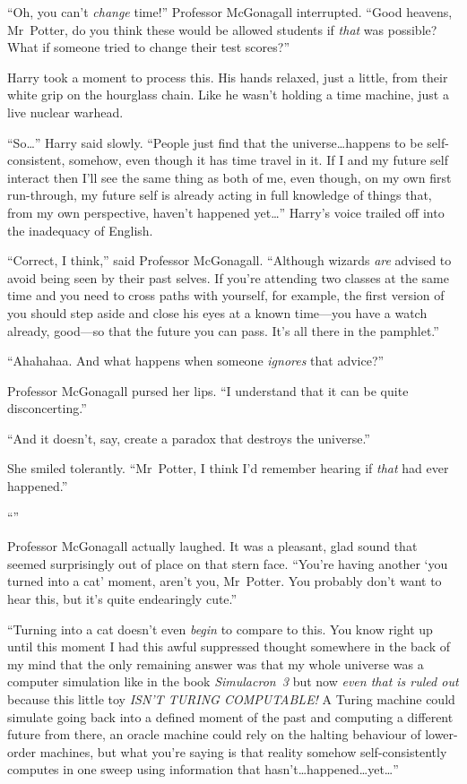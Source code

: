 “Oh, you can’t \emph{change} time!” Professor McGonagall interrupted. “Good heavens, Mr~Potter, do you think these would be allowed students if \emph{that} was possible? What if someone tried to change their test scores?”

Harry took a moment to process this. His hands relaxed, just a little, from their white grip on the hourglass chain. Like he wasn’t holding a time machine, just a live nuclear warhead.

“So…” Harry said slowly. “People just find that the universe…happens to be self-consistent, somehow, even though it has time travel in it. If I and my future self interact then I’ll see the same thing as both of me, even though, on my own first run-through, my future self is already acting in full knowledge of things that, from my own perspective, haven’t happened yet…” Harry’s voice trailed off into the inadequacy of English.

“Correct, I think,” said Professor McGonagall. “Although wizards \emph{are} advised to avoid being seen by their past selves. If you’re attending two classes at the same time and you need to cross paths with yourself, for example, the first version of you should step aside and close his eyes at a known time—you have a watch already, good—so that the future you can pass. It’s all there in the pamphlet.”

“Ahahahaa. And what happens when someone \emph{ignores} that advice?”

Professor McGonagall pursed her lips. “I understand that it can be quite disconcerting.”

“And it doesn’t, say, create a paradox that destroys the universe.”

She smiled tolerantly. “Mr~Potter, I think I’d remember hearing if \emph{that} had ever happened.”

“”

Professor McGonagall actually laughed. It was a pleasant, glad sound that seemed surprisingly out of place on that stern face. “You’re having another ‘you turned into a cat’ moment, aren’t you, Mr~Potter. You probably don’t want to hear this, but it’s quite endearingly cute.”

“Turning into a cat doesn’t even \emph{begin} to compare to this. You know right up until this moment I had this awful suppressed thought somewhere in the back of my mind that the only remaining answer was that my whole universe was a computer simulation like in the book \emph{Simulacron~3} but now \emph{even that is ruled out} because this little toy \emph{ISN’T TURING COMPUTABLE!} A Turing machine could simulate going back into a defined moment of the past and computing a different future from there, an oracle machine could rely on the halting behaviour of lower-order machines, but what you’re saying is that reality somehow self-consistently computes in one sweep using information that hasn’t…happened…yet…”

